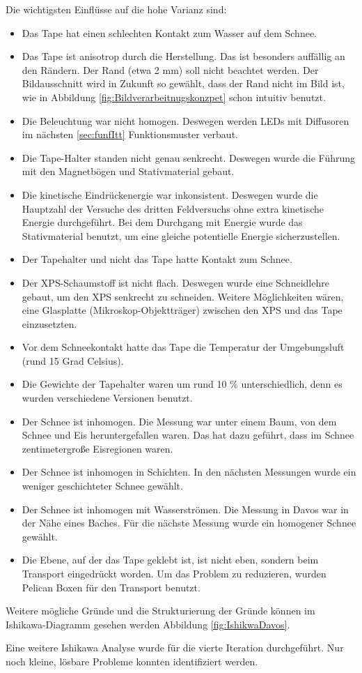 Die wichtigsten Einflüsse auf die hohe Varianz sind:
\begin{itemize}
\item Das Tape hat einen schlechten Kontakt zum Wasser auf dem Schnee.
\item Das Tape ist anisotrop durch die Herstellung. Das ist besonders auffällig an den Rändern. Der Rand (etwa 2 mm) soll nicht beachtet werden. Der Bildausschnitt wird in Zukunft so gewählt, dass der Rand nicht im Bild ist, wie in Abbildung \ref{fig:Bildverarbeitnugskonzpet} schon intuitiv benutzt. 

\item Die Beleuchtung war nicht homogen. Deswegen werden LEDs mit Diffusoren im nächsten \ref{sec:funfItt} Funktionsmuster verbaut.
\item Die Tape-Halter standen nicht genau senkrecht. Deswegen wurde die Führung mit den Magnetbögen und Stativmaterial gebaut.
\item Die kinetische Eindrückenergie war inkonsistent. Deswegen wurde die Hauptzahl der Versuche des dritten Feldversuchs ohne extra kinetische Energie durchgeführt. Bei dem Durchgang mit Energie wurde das Stativmaterial benutzt, um eine gleiche potentielle Energie sicherzustellen.
\item Der Tapehalter und nicht das Tape hatte Kontakt zum Schnee.
\item Der XPS-Schaumstoff ist nicht flach. Deswegen wurde eine Schneidlehre gebaut, um den XPS senkrecht zu schneiden. Weitere Möglichkeiten wären, eine Glasplatte (Mikroskop-Objektträger) zwischen den XPS und das Tape einzusetzten.
\item Vor dem Schneekontakt hatte das Tape die Temperatur der Umgebungsluft (rund 15 Grad Celsius).
\item Die Gewichte der Tapehalter waren um rund 10 \% unterschiedlich, denn es wurden verschiedene Versionen benutzt.
\item Der Schnee ist inhomogen. Die Messung war unter einem Baum, von dem Schnee und Eis heruntergefallen waren. Das hat dazu geführt, dass im Schnee zentimetergroße Eisregionen waren.
\item Der Schnee ist inhomogen in Schichten. In den nächsten Messungen wurde ein weniger geschichteter Schnee gewählt.
\item Der Schnee ist inhomogen mit Wasserströmen. Die Messung in Davos war in der Nähe eines Baches. Für die nächste Messung wurde ein homogener Schnee gewählt.
\item Die Ebene, auf der das Tape geklebt ist, ist nicht eben, sondern beim Transport eingedrückt worden. Um das Problem zu reduzieren, wurden Pelican Boxen für den Transport benutzt.
\end{itemize}

Weitere mögliche Gründe und die Strukturierung der Gründe können im Ishikawa-Diagramm gesehen werden Abbildung \ref{fig:IshikwaDavos}.

Eine weitere Ishikawa Analyse wurde für die vierte Iteration durchgeführt. Nur noch kleine, lösbare Probleme konnten identifiziert werden.
